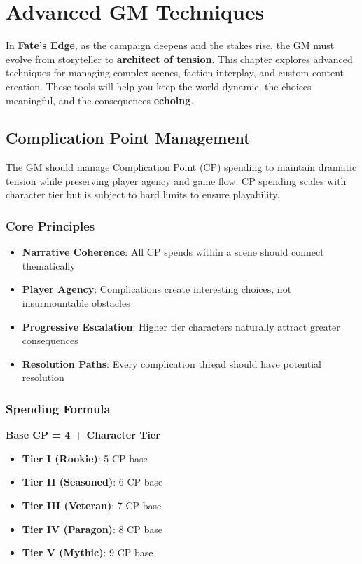 
\chapter{Advanced GM Techniques}

In \textbf{Fate's Edge}, as the campaign deepens and the stakes rise, the GM must evolve from storyteller to \textbf{architect of tension}. This chapter explores advanced techniques for managing complex scenes, faction interplay, and custom content creation. These tools will help you keep the world dynamic, the choices meaningful, and the consequences \textbf{echoing}.

\section{Complication Point Management}

The GM should manage Complication Point (CP) spending to maintain dramatic tension while preserving player agency and game flow. CP spending scales with character tier but is subject to hard limits to ensure playability.

\subsection{Core Principles}
\begin{itemize}
    \item \textbf{Narrative Coherence}: All CP spends within a scene should connect thematically
    \item \textbf{Player Agency}: Complications create interesting choices, not insurmountable obstacles
    \item \textbf{Progressive Escalation}: Higher tier characters naturally attract greater consequences
    \item \textbf{Resolution Paths}: Every complication thread should have potential resolution
\end{itemize}

\subsection{Spending Formula}
\textbf{Base CP = 4 + Character Tier}
\begin{itemize}
    \item \textbf{Tier I (Rookie)}: 5 CP base
    \item \textbf{Tier II (Seasoned)}: 6 CP base
    \item \textbf{Tier III (Veteran)}: 7 CP base
    \item \textbf{Tier IV (Paragon)}: 8 CP base
    \item \textbf{Tier V (Mythic)}: 9 CP base
\end{itemize}


